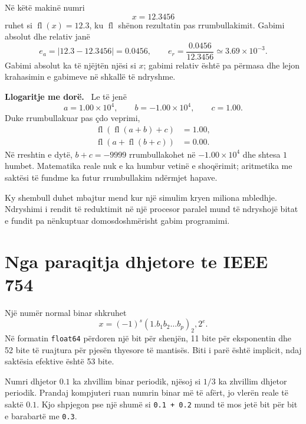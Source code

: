 \documentclass[11pt,oneside,openany]{book}
\newenvironment{llogaritjedore}{\par\medskip\noindent\textbf{Llogaritje me dorë.}\ }{\par\medskip}
\begin{document}
Në këtë makinë numri
\begin{equation}
 x=12.3456
\end{equation}
ruhet si $\operatorname{fl}(x)=12.3$, ku $\operatorname{fl}$ shënon
rezultatin pas rrumbullakimit. Gabimi absolut dhe relativ janë
\begin{equation}
 e_a=|12.3-12.3456|=0.0456,
 \qquad
 e_r=\frac{0.0456}{12.3456}\simeq3.69\times10^{-3}.
\end{equation}
Gabimi absolut ka të njëjtën njësi si $x$; gabimi relativ është pa përmasa dhe
lejon krahasimin e gabimeve në shkallë të ndryshme.

\begin{llogaritjedore}
Le të jenë
\begin{equation}
 a=1.00\times10^4,\qquad b=-1.00\times10^4,\qquad c=1.00.
\end{equation}
Duke rrumbullakuar pas çdo veprimi,
\begin{align}
 \operatorname{fl}(\operatorname{fl}(a+b)+c)&=1.00,\\
 \operatorname{fl}(a+\operatorname{fl}(b+c))&=0.00.
\end{align}
Në rreshtin e dytë, $b+c=-9999$ rrumbullakohet në $-1.00\times10^4$ dhe
shtesa $1$ humbet. Matematika reale nuk e ka humbur vetinë e shoqërimit;
aritmetika me saktësi të fundme ka futur rrumbullakim ndërmjet hapave.
\end{llogaritjedore}

Ky shembull duhet mbajtur mend kur një simulim kryen miliona mbledhje.
Ndryshimi i rendit të reduktimit në një procesor paralel mund të ndryshojë
bitat e fundit pa nënkuptuar domosdoshmërisht gabim programimi.

\section{Nga paraqitja dhjetore te IEEE 754}
Një numër normal binar shkruhet
\begin{equation}
 x=(-1)^s(1.b_1b_2\ldots b_p)_2,2^e.
\end{equation}
Në formatin \texttt{float64} përdoren një bit për shenjën, 11 bite për
eksponentin dhe 52 bite të ruajtura për pjesën thyesore të mantisës. Biti i
parë është implicit, ndaj saktësia efektive është 53 bite.

Numri dhjetor $0.1$ ka zhvillim binar periodik, njësoj si $1/3$ ka zhvillim
dhjetor periodik. Prandaj kompjuteri ruan numrin binar më të afërt, jo
vlerën reale të saktë $0.1$. Kjo shpjegon pse një shumë si
\texttt{0.1 + 0.2} mund të mos jetë bit për bit e barabartë me \texttt{0.3}.
\end{document}
